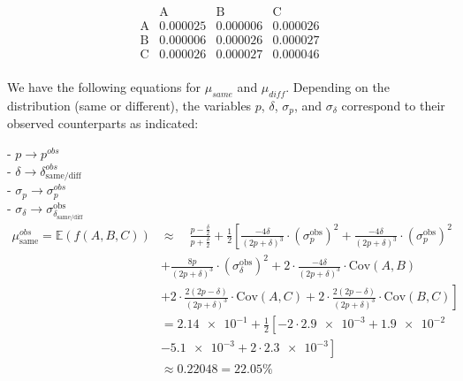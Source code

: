 \[
\begin{array}{c|ccc}
           & \text{A} & \text{B} & \text{C} \\
\hline
\text{A} & 0.000025 & 0.000006 & 0.000026 \\
\text{B} & 0.000006 & 0.000026 & 0.000027 \\
\text{C}  & 0.000026 & 0.000027 & 0.000046 \\
\end{array}
\]
\begin{center}\end{center}

We have the following equations for \(\mu_{same}\) and \(\mu_{diff}\). Depending on the distribution (same or different), the variables \(p\), \(\delta\), \(\sigma_p\), and \(\sigma_\delta\) correspond to their observed counterparts as indicated:

- \(p \rightarrow p^{obs}\)\\
- \(\delta \rightarrow \delta_{\text{same/diff}}^{obs}\)\\
- \(\sigma_p \rightarrow \sigma_p^{obs}\)\\
- \(\sigma_\delta \rightarrow \sigma_{\delta_{\text{same/diff}}}^{\text{obs}}\)\\

\begin{equation}
    \begin{aligned}
    \mu_{\text{same}}^{obs} = \mathbb{E}(f(A,B,C)) &\approx \quad \frac{p - \frac{\delta}{2}}{p + \frac{\delta}{2}} + \frac{1}{2} \left[ \frac{-4\delta}{(2p + \delta)^3}\cdot({\sigma^\text{obs}_p})^2 + \frac{-4\delta}{(2p + \delta)^3}\cdot({\sigma^\text{obs}_p})^2 \right. \\[2mm]
    & \left. + \frac{8p}{(2p + \delta)^3}\cdot({\sigma^\text{obs}_\delta})^2 + 2\cdot\frac{-4\delta}{(2p + \delta)^3}\cdot\text{Cov}(A,B) \right. \\[2mm] 
    & \left. + 2\cdot\frac{2(2p - \delta)}{(2p + \delta)^3}\cdot\text{Cov}(A,C) + 2\cdot\frac{2(2p - \delta)}{(2p + \delta)^3}\cdot\text{Cov}(B,C) \right]\\[10mm]
    & = \num{2.14e-1} + \frac{1}{2} \left[ -2\cdot\num{2.9e-3} + \num{1.9e-2}  \right. \\[2mm]
    & \left. - \num{5.1e-3} + 2\cdot\num{2.3e-3} \right] \\[10mm]
    & \approx 0.22048 = 22.05\%
    \end{aligned}
    \label{eq:mu_same}
\end{equation}

